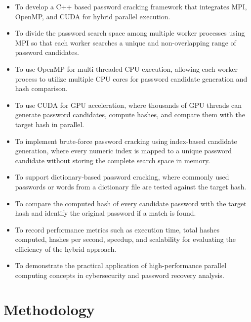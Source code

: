 \documentclass[12pt,a4paper]{article}
\begin{document}
\begin{itemize}
    \item To develop a C++ based password cracking framework that integrates MPI, OpenMP, and CUDA for hybrid parallel execution.

    \item To divide the password search space among multiple worker processes using MPI so that each worker searches a unique and non-overlapping range of password candidates.

    \item To use OpenMP for multi-threaded CPU execution, allowing each worker process to utilize multiple CPU cores for password candidate generation and hash comparison.

    \item To use CUDA for GPU acceleration, where thousands of GPU threads can generate password candidates, compute hashes, and compare them with the target hash in parallel.

    \item To implement brute-force password cracking using index-based candidate generation, where every numeric index is mapped to a unique password candidate without storing the complete search space in memory.

    \item To support dictionary-based password cracking, where commonly used passwords or words from a dictionary file are tested against the target hash.

    \item To compare the computed hash of every candidate password with the target hash and identify the original password if a match is found.

    \item To record performance metrics such as execution time, total hashes computed, hashes per second, speedup, and scalability for evaluating the efficiency of the hybrid approach.

    \item To demonstrate the practical application of high-performance parallel computing concepts in cybersecurity and password recovery analysis.
\end{itemize}

\break

\section{Methodology}
\end{document}
